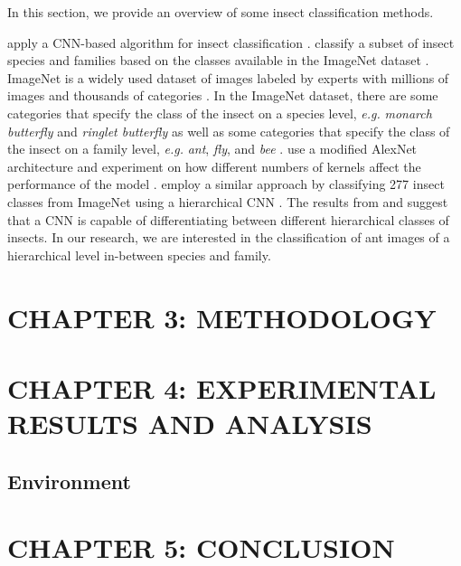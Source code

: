 \documentclass[12pt]{article}
\begin{document}
In this section, we provide an overview of some insect classification methods.

\citeauthor*{lim_performance_2017} apply a CNN-based algorithm for insect
classification \cite{lim_performance_2017}. \citeauthor*{lim_performance_2017}
classify a subset of insect species and families based on the classes available
in the ImageNet dataset \cite{deng_imagenet_2009}. ImageNet is a widely used
dataset of images labeled by experts with millions of images and thousands of
categories \cite{deng_imagenet_2009}. In the ImageNet dataset, there are some
categories that specify the class of the insect on a species level,
\textit{e.g.} \textit{monarch butterfly} and \textit{ringlet butterfly} as well
as some categories that specify the class of the insect on a family level,
\textit{e.g.} \textit{ant}, \textit{fly}, and \textit{bee}
\cite{imagenet_labels}. \citeauthor*{lim_performance_2017} use a modified
AlexNet architecture and experiment on how different numbers of kernels affect
the performance of the model \cite{lim_performance_2017}.
\citeauthor*{glick_insect_2016} employ a similar approach by classifying 277
insect classes from ImageNet using a hierarchical CNN \cite{glick_insect_2016}.
The results from \citeauthor*{lim_performance_2017} and
\citeauthor*{glick_insect_2016} suggest that a CNN is capable of differentiating
between different hierarchical classes of insects. In our research, we are
interested in the classification of ant images of a hierarchical level
in-between species and family.



\newpage
\section{CHAPTER 3: METHODOLOGY}
\newpage
\section{CHAPTER 4: EXPERIMENTAL RESULTS AND ANALYSIS}

\subsection{Environment}
\newpage
\section{CHAPTER 5: CONCLUSION}
\newpage

\printbibliography
\end{document}
